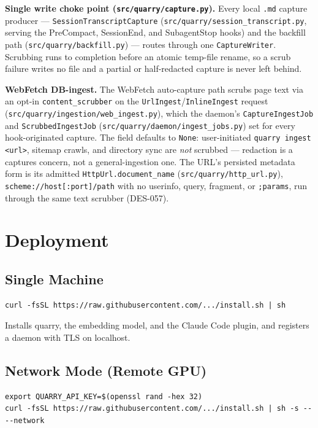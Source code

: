 \documentclass[a4paper,10pt]{article}
\newcommand{\modpath}[1]{\texttt{src/quarry/#1}}
\begin{document}
\textbf{Single write choke point (\modpath{capture.py}).}  Every local
\texttt{.md} capture producer --- \texttt{SessionTranscriptCapture}
(\modpath{session\_transcript.py}, serving the PreCompact, SessionEnd, and
SubagentStop hooks) and the backfill path (\modpath{backfill.py}) ---
routes through one \texttt{CaptureWriter}.  Scrubbing runs to completion before an atomic
temp-file rename, so a scrub failure writes no file and a partial or
half-redacted capture is never left behind.

\textbf{WebFetch DB-ingest.}  The WebFetch auto-capture path scrubs page
text via an opt-in \texttt{content\_scrubber} on the
\texttt{UrlIngest}/\texttt{InlineIngest} request
(\modpath{ingestion/web\_ingest.py}), which the daemon's
\texttt{CaptureIngestJob} and \texttt{ScrubbedIngestJob}
(\modpath{daemon/ingest\_jobs.py}) set for every hook-originated capture.
The field defaults to \texttt{None}: user-initiated \texttt{quarry ingest <url>},
sitemap crawls, and directory sync are \emph{not} scrubbed --- redaction
is a captures concern, not a general-ingestion one.  The URL's persisted
metadata form is its admitted \texttt{HttpUrl.document\_name}
(\modpath{http\_url.py}), \texttt{scheme://host[:port]/path} with no
userinfo, query, fragment, or \texttt{;params}, run through the same text
scrubber (DES-057).

\section{Deployment}

\subsection{Single Machine}

\begin{lstlisting}
curl -fsSL https://raw.githubusercontent.com/.../install.sh | sh
\end{lstlisting}

Installs quarry, the embedding model, and the Claude Code plugin, and
registers a daemon with TLS on localhost.

\subsection{Network Mode (Remote GPU)}

\begin{lstlisting}
export QUARRY_API_KEY=$(openssl rand -hex 32)
curl -fsSL https://raw.githubusercontent.com/.../install.sh | sh -s -- --network
\end{lstlisting}
\end{document}
